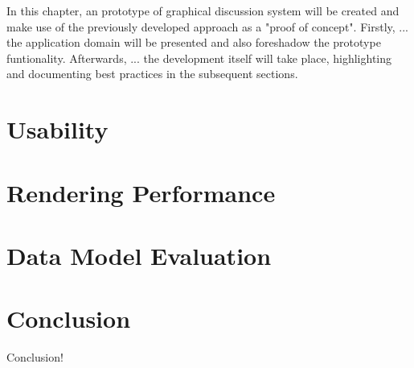 In this chapter, an prototype of graphical discussion system will be created and make use of the previously developed approach as a "proof of concept". Firstly, ... the application domain will be presented and also foreshadow the prototype funtionality. Afterwards, ... the development itself will take place, highlighting and documenting best practices in the subsequent sections.



\section{Usability}


\section{Rendering Performance}


\section{Data Model Evaluation}




\section{Conclusion}
Conclusion!
